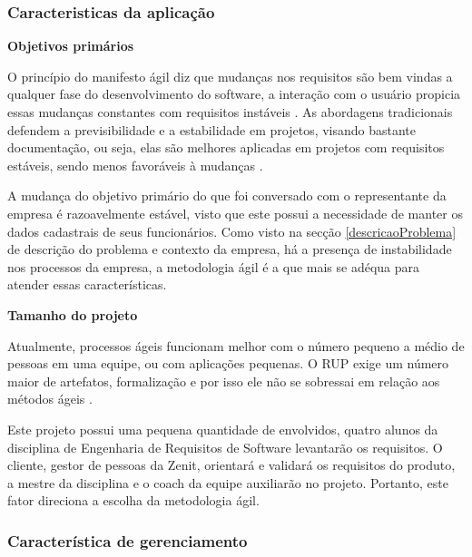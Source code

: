 \subsubsection{Caracteristicas da aplicação}
\begin{description}
\item \textbf{Objetivos primários}

O princípio do manifesto ágil diz que mudanças nos requisitos são bem vindas a qualquer fase do desenvolvimento do software, a interação com o usuário propicia essas mudanças constantes com requisitos instáveis \cite{agileManifest}. As abordagens tradicionais defendem a previsibilidade e a estabilidade em projetos, visando bastante documentação, ou seja, elas são melhores aplicadas em projetos com requisitos estáveis, sendo menos favoráveis à mudanças  \cite{boehm2004}.

A mudança do objetivo primário do que foi conversado com o representante da empresa é razoavelmente estável, visto que este possui a necessidade de manter os dados cadastrais de seus funcionários. Como visto na secção \ref{descricaoProblema} de descrição do problema e contexto da empresa, há a presença de instabilidade nos processos da empresa, a metodologia ágil é a que mais se adéqua para atender essas características.

\item \textbf{Tamanho do projeto}

Atualmente, processos ágeis funcionam melhor com o número pequeno a médio de pessoas em uma equipe, ou com aplicações pequenas. O RUP exige um número maior de artefatos, formalização e por isso ele não se sobressai em relação aos métodos ágeis \cite{boehm2004}.

Este projeto possui uma pequena quantidade de envolvidos, quatro alunos da disciplina de Engenharia de Requisitos de Software levantarão os requisitos. O cliente, gestor de pessoas da Zenit, orientará e validará os requisitos do produto, a mestre da disciplina e o coach da equipe auxiliarão no projeto. Portanto, este fator direciona a escolha da metodologia ágil.
\end{description}
\subsubsection{Característica de gerenciamento}


